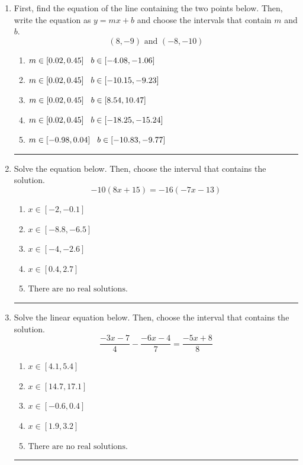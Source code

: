 \documentclass[14pt]{extbook}
\newcommand{\litem}[1]{\item#1\hspace*{-1cm}\rule{\textwidth}{0.4pt}}
\begin{document}
\begin{enumerate}
{\begin{enumerate}[label=\Alph*.]
\end{enumerate} }
\litem{
First, find the equation of the line containing the two points below. Then, write the equation as $ y=mx+b $ and choose the intervals that contain $m$ and $b$.\[ (8, -9) \text{ and } (-8, -10) \]\begin{enumerate}[label=\Alph*.]
\item \( m \in [0.02, 0.45] \hspace*{3mm} b \in [-4.08, -1.06] \)
\item \( m \in [0.02, 0.45] \hspace*{3mm} b \in [-10.15, -9.23] \)
\item \( m \in [0.02, 0.45] \hspace*{3mm} b \in [8.54, 10.47] \)
\item \( m \in [0.02, 0.45] \hspace*{3mm} b \in [-18.25, -15.24] \)
\item \( m \in [-0.98, 0.04] \hspace*{3mm} b \in [-10.83, -9.77] \)

\end{enumerate} }
\litem{
Solve the equation below. Then, choose the interval that contains the solution.\[ -10(8x + 15) = -16(-7x -13) \]\begin{enumerate}[label=\Alph*.]
\item \( x \in [-2, -0.1] \)
\item \( x \in [-8.8, -6.5] \)
\item \( x \in [-4, -2.6] \)
\item \( x \in [0.4, 2.7] \)
\item \( \text{There are no real solutions.} \)

\end{enumerate} }

\litem{
Solve the linear equation below. Then, choose the interval that contains the solution.\[ \frac{-3x -7}{4} - \frac{-6x -4}{7} = \frac{-5x + 8}{8} \]\begin{enumerate}[label=\Alph*.]
\item \( x \in [4.1, 5.4] \)
\item \( x \in [14.7, 17.1] \)
\item \( x \in [-0.6, 0.4] \)
\item \( x \in [1.9, 3.2] \)
\item \( \text{There are no real solutions.} \)

\end{enumerate} }
\end{enumerate}
\end{document}
